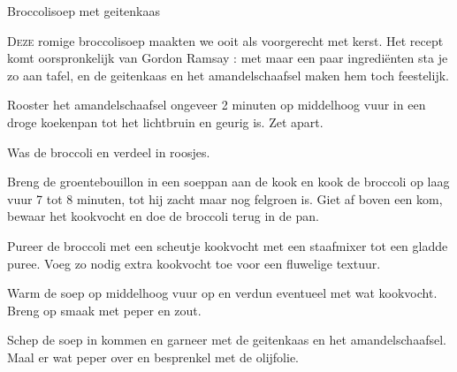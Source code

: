 \begin{recipe}{Broccolisoep met geitenkaas}


\lettrine{D}{eze} romige broccolisoep maakten we ooit als voorgerecht met kerst.
Het recept komt oorspronkelijk van Gordon Ramsay \cite{ramsay-broccolisoep}: met
maar een paar ingrediënten sta je zo aan tafel, en de geitenkaas en het
amandelschaafsel maken hem toch feestelijk.

\begin{ingredients}
\end{ingredients}

\begin{steps}
  \item Rooster het amandelschaafsel ongeveer 2 minuten op middelhoog vuur in
        een droge koekenpan tot het lichtbruin en geurig is. Zet apart.
  \item Was de broccoli en verdeel in roosjes.
  \item Breng de groentebouillon in een soeppan aan de kook en kook de
        broccoli op laag vuur 7 tot 8 minuten, tot hij zacht maar nog
        felgroen is. Giet af boven een kom, bewaar het kookvocht en doe de
        broccoli terug in de pan.
  \item Pureer de broccoli met een scheutje kookvocht met een staafmixer tot
        een gladde puree. Voeg zo nodig extra kookvocht toe voor een
        fluwelige textuur.
  \item Warm de soep op middelhoog vuur op en verdun eventueel met wat
        kookvocht. Breng op smaak met peper en zout.
  \item Schep de soep in kommen en garneer met de geitenkaas en het
        amandelschaafsel. Maal er wat peper over en besprenkel met de
        olijfolie.
\end{steps}
\end{recipe}
